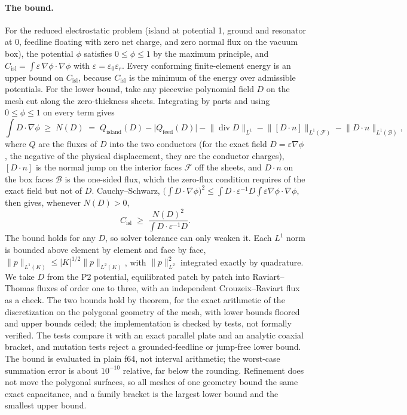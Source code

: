 \documentclass{anvil-paper}
\newcommand{\Cisl}{C_{\mathrm{isl}}}
\begin{document}
\paragraph{The bound.}
For the reduced electrostatic problem (island at potential 1, ground and
resonator at 0, feedline floating with zero net charge, and zero normal
flux on the vacuum box), the potential
$\phi$ satisfies $0 \le \phi \le 1$ by the maximum principle, and
$\Cisl = \int \varepsilon\,\nabla\phi\cdot\nabla\phi$ with $\varepsilon
= \varepsilon_0\varepsilon_r$. Every conforming finite-element energy is an
upper bound on $\Cisl$, because $\Cisl$ is the minimum of the energy
over admissible potentials. For the lower bound, take any piecewise
polynomial field $D$ on the mesh cut along the zero-thickness sheets.
Integrating by parts and using $0\le\phi\le1$ on every term gives
\begin{equation}
  \int D\cdot\nabla\phi \;\ge\; N(D) \;=\; Q_{\mathrm{island}}(D)
  - \lvert Q_{\mathrm{feed}}(D)\rvert
  - \lVert \operatorname{div} D\rVert_{L^1}
  - \lVert [D\cdot n]\rVert_{L^1(\mathcal F)}
  - \lVert D\cdot n\rVert_{L^1(\mathcal B)},
  \label{eq:cert-n}
\end{equation}
where $Q$ are the fluxes of $D$ into the two conductors (for the exact
field $D = \varepsilon\nabla\phi$, the negative of the physical
displacement, they are the conductor charges),
$[D\cdot n]$ is the normal jump on the interior faces $\mathcal F$ off
the sheets, and $D\cdot n$ on the box faces $\mathcal B$ is the one-sided
flux, which the zero-flux condition requires of the exact field but not
of $D$. Cauchy--Schwarz, $\bigl(\int D\cdot\nabla\phi\bigr)^2 \le
\int D\cdot\varepsilon^{-1}D \int\varepsilon\nabla\phi\cdot\nabla\phi$,
then gives, whenever $N(D) > 0$,
\begin{equation}
  \Cisl \;\ge\; \frac{N(D)^2}{\int D\cdot\varepsilon^{-1}D}.
  \label{eq:cert}
\end{equation}
The bound holds for any $D$, so solver tolerance can only weaken it. Each
$L^1$ norm is bounded above element by element and face by face,
$\lVert p\rVert_{L^1(K)} \le |K|^{1/2}\lVert p\rVert_{L^2(K)}$, with
$\lVert p\rVert_{L^2}^2$ integrated exactly by quadrature. We
take $D$ from the P2 potential, equilibrated patch by patch into
Raviart--Thomas fluxes of order one to three, with an independent
Crouzeix--Raviart flux as a check. The two bounds hold by theorem, for the
exact arithmetic of the discretization on the polygonal geometry of the
mesh, with lower bounds floored and upper bounds ceiled; the implementation
is checked by tests, not formally verified. The tests compare it with an
exact parallel plate and an analytic coaxial bracket, and mutation tests
reject a grounded-feedline or jump-free lower bound. The bound is evaluated
in plain f64, not interval arithmetic; the worst-case summation error is about
$10^{-10}$ relative, far below the rounding. Refinement does not move the
polygonal surfaces, so all meshes of one geometry bound the same exact
capacitance, and a family bracket is the largest lower bound and the
smallest upper bound.
\end{document}
